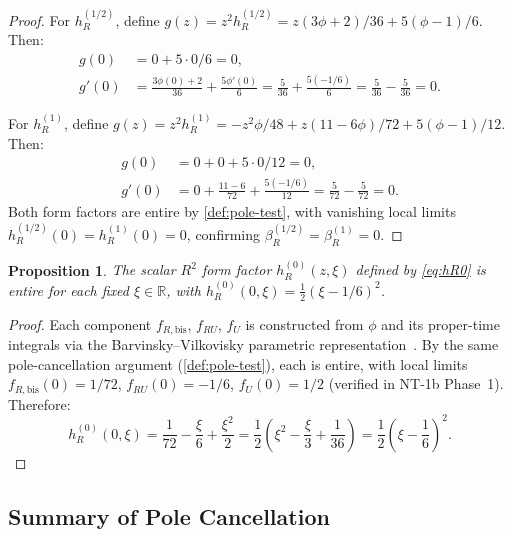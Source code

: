 \documentclass[11pt,a4paper]{article}
\theoremstyle{plain}
\newtheorem{proposition}[theorem]{Proposition}
\theoremstyle{definition}
\begin{document}
\begin{proof}
For $h_R^{(1/2)}$, define
$g(z) = z^2 h_R^{(1/2)} = z(3\phi+2)/36 + 5(\phi-1)/6$. Then:
\begin{align}
  g(0) &= 0 + 5 \cdot 0/6 = 0,\\
  g'(0) &= \frac{3\phi(0)+2}{36} + \frac{5\phi'(0)}{6}
    = \frac{5}{36} + \frac{5(-1/6)}{6} = \frac{5}{36} - \frac{5}{36} = 0.
\end{align}

For $h_R^{(1)}$, define
$g(z) = z^2 h_R^{(1)} = -z^2\phi/48 + z(11-6\phi)/72 + 5(\phi-1)/12$.
Then:
\begin{align}
  g(0) &= 0 + 0 + 5 \cdot 0/12 = 0,\\
  g'(0) &= 0 + \frac{11-6}{72} + \frac{5(-1/6)}{12}
    = \frac{5}{72} - \frac{5}{72} = 0.
\end{align}
Both form factors are entire by \cref{def:pole-test}, with vanishing
local limits $h_R^{(1/2)}(0) = h_R^{(1)}(0) = 0$, confirming
$\beta_R^{(1/2)} = \beta_R^{(1)} = 0$.
\end{proof}

\begin{proposition}\label{prop:hR0-entire}
The scalar $R^2$ form factor $h_R^{(0)}(z,\xi)$ defined by \cref{eq:hR0}
is entire for each fixed $\xi \in \mathbb{R}$, with
$h_R^{(0)}(0,\xi) = \frac{1}{2}(\xi - 1/6)^2$.
\end{proposition}

\begin{proof}
Each component $f_{R,\mathrm{bis}}$, $f_{RU}$, $f_U$ is constructed
from $\phi$ and its proper-time integrals via the Barvinsky--Vilkovisky
parametric representation~\cite{BV87}. By the same pole-cancellation
argument (\cref{def:pole-test}), each is entire, with local limits
$f_{R,\mathrm{bis}}(0) = 1/72$, $f_{RU}(0) = -1/6$, $f_U(0) = 1/2$
(verified in NT-1b Phase~1). Therefore:
\begin{equation}
  h_R^{(0)}(0,\xi) = \frac{1}{72} - \frac{\xi}{6} + \frac{\xi^2}{2}
  = \frac{1}{2}\left(\xi^2 - \frac{\xi}{3} + \frac{1}{36}\right)
  = \frac{1}{2}\left(\xi - \frac{1}{6}\right)^2.
\end{equation}
\end{proof}

\subsection{Summary of Pole Cancellation}
\end{document}
